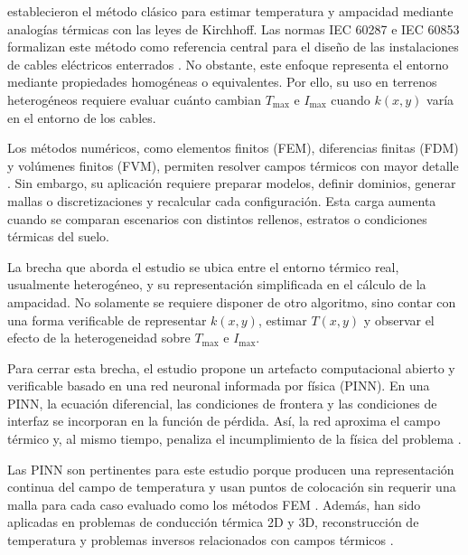 \documentclass[11pt]{article}
\newcommand{\Tmax}{T_{\max}}
\newcommand{\Imax}{I_{\max}}
\newcommand{\kx}{k(x,y)}
\begin{document}
\textcite[752--760]{neher1957} establecieron el método clásico para estimar temperatura y ampacidad mediante analogías térmicas con las leyes de Kirchhoff. Las normas IEC 60287 e IEC 60853 formalizan este método como referencia central para el diseño de las instalaciones de cables eléctricos enterrados \parencites{iec60287}{iec60853}. No obstante, este enfoque representa el entorno mediante propiedades homogéneas o equivalentes. Por ello, su uso en terrenos heterogéneos requiere evaluar cuánto cambian \(\Tmax\) e \(\Imax\) cuando \(\kx\) varía en el entorno de los cables.

Los métodos numéricos, como elementos finitos (FEM), diferencias finitas (FDM) y volúmenes finitos (FVM), permiten resolver campos térmicos con mayor detalle \parencites[4--6]{enescu2021}[3--4,93--99]{cigre2025}{patankar1980numerical}[1--3,12]{aldulaimi2024}[1--4]{oclon2015}[1--3]{atoccsa2024}. Sin embargo, su aplicación requiere preparar modelos, definir dominios, generar mallas o discretizaciones y recalcular cada configuración. Esta carga aumenta cuando se comparan escenarios con distintos rellenos, estratos o condiciones térmicas del suelo.

La brecha que aborda el estudio se ubica entre el entorno térmico real, usualmente heterogéneo, y su representación simplificada en el cálculo de la ampacidad. No solamente se requiere disponer de otro algoritmo, sino contar con una forma verificable de representar \(\kx\), estimar \(T(x,y)\) y observar el efecto de la heterogeneidad sobre \(\Tmax\) e \(\Imax\).

Para cerrar esta brecha, el estudio propone un artefacto computacional abierto y verificable basado en una red neuronal informada por física (PINN). En una PINN, la ecuación diferencial, las condiciones de frontera y las condiciones de interfaz se incorporan en la función de pérdida. Así, la red aproxima el campo térmico y, al mismo tiempo, penaliza el incumplimiento de la física del problema \parencite[686--690]{raissi2019}.

Las PINN son pertinentes para este estudio porque producen una representación continua del campo de temperatura y usan puntos de colocación sin requerir una malla para cada caso evaluado como los métodos FEM \parencites[686--690]{raissi2019}[3--4]{xing2023}{cuomo2022}. Además, han sido aplicadas en problemas de conducción térmica 2D y 3D, reconstrucción de temperatura y problemas inversos relacionados con campos térmicos \parencites[1--3]{xing2023}[1,5]{pan2025}[1--2]{liu2026}{billah2023}{chen2024}.
\end{document}
